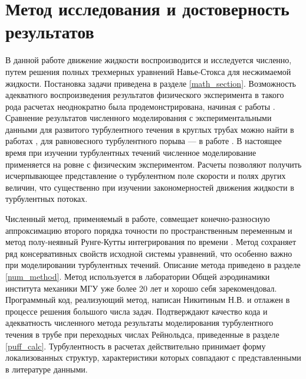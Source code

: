 \section{Метод исследования и достоверность результатов}

В данной работе движение жидкости воспроизводится и исследуется численно, путем решения полных трехмерных уравнений Навье-Стокса для несжимаемой жидкости. Постановка задачи приведена в разделе \ref{math_section}. Возможность адекватного воспроизведения результатов физического эксперимента в такого рода расчетах неоднократно была продемонстрирована, начиная с работы \cite{Kim1987}. Сравнение результатов численного моделирования с экспериментальными данными для развитого турбулентного течения в круглых трубах можно найти в работах \cite{Priymak1998, Nikitin2006}, для равновесного турбулентного порыва --- в работе \cite{Priymak2004}. В настоящее время при изучении турбулентных течений численное моделирование применяется на ровне с физическим экспериментом. Расчеты позволяют получить исчерпывающее представление о турбулентном поле скорости и полях других величин, что существенно при изучении закономерностей движения жидкости в турбулентных потоках. 

Численный метод, применяемый в работе, совмещает конечно-разносную аппроксимацию второго порядка точности по пространственным переменным и метод полу-неявный Рунге-Кутты интегрирования по времени \cite{Nikitin2006, Nikitin2006third}. Метод сохраняет ряд консервативных свойств исходной системы уравнений, что особенно важно при моделировании турбулентных течений. Описание метода приведено в разделе \ref{num_method}. Метод используется в лаборатории Общей аэродинамики института механики МГУ уже более 20 лет и хорошо себя зарекомендовал. Программный код, реализующий метод, написан Никитиным Н.В. и отлажен в процессе решения большого числа задач. Подтверждают качество кода и адекватность численного метода результаты моделирования турбулентного течения в трубе при переходных числах Рейнольдса, приведенные в разделе \ref{puff_calc}. Турбулентность в расчетах действительно принимает форму локализованных структур, характеристики которых совпадают с представленными в литературе данными. 

